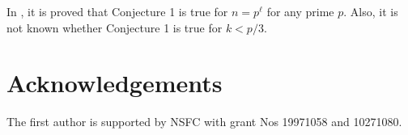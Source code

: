 \documentclass[fleqn]{mat01}
\begin{document}

In \cite{gaothaw}, it is proved that Conjecture 1 is true for $n =
p^\ell$ for any prime $p$. Also, it is not known whether Conjecture 1 is
true for $k < p/3$.

\section*{Acknowledgements}

The first author is supported by NSFC with grant Nos 19971058 and
10271080.
\end{document}
